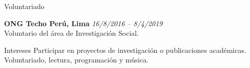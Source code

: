 \documentclass[
11pt, %
]{resume} %
\begin{document}
		
		
		\begin{rSection}{Voluntariado}
			
			\textbf{ONG Techo Perú, Lima} \hfill \textit{16/8/2016 – 8/4/2019} \\ 
			Voluntario del área de Investigación Social. 
		\end{rSection}
		
		\begin{rSection}{Intereses}
			Participar en proyectos de investigación o publicaciones académicas. Voluntariado, lectura, programación y música.
		\end{rSection}	
		
		
	
\end{document}

